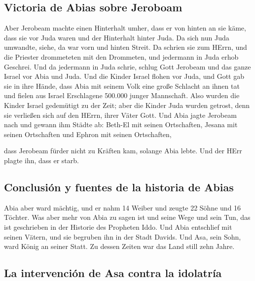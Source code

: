 \hypertarget{victoria-de-abias-sobre-jeroboam}{%
\subsection{Victoria de Abias sobre
Jeroboam}\label{victoria-de-abias-sobre-jeroboam}}

 Aber Jerobeam machte einen Hinterhalt umher, dass er von
hinten an sie käme, dass sie vor Juda waren und der Hinterhalt hinter
Juda.  Da sich nun Juda umwandte, siehe, da war vorn und
hinten Streit. Da schrien sie zum HErrn, und die Priester drommeteten
mit den Drommeten,  und jedermann in Juda erhob Geschrei.
Und da jedermann in Juda schrie, schlug Gott Jerobeam und das ganze
Israel vor Abia und Juda.  Und die Kinder Israel flohen
vor Juda, und Gott gab sie in ihre Hände,  dass Abia mit
seinem Volk eine große Schlacht an ihnen tat und fielen aus Israel
Erschlagene 500.000 junger Mannschaft.  Also wurden die
Kinder Israel gedemütigt zu der Zeit; aber die Kinder Juda wurden
getrost, denn sie verließen sich auf den HErrn, ihrer Väter Gott.
 Und Abia jagte Jerobeam nach und gewann ihm Städte ab:
Beth-El mit seinen Ortschaften, Jesana mit seinen Ortschaften und Ephron
mit seinen Ortschaften,

 dass Jerobeam fürder nicht zu Kräften kam, solange Abia
lebte. Und der HErr plagte ihn, dass er starb.

\hypertarget{conclusiuxf3n-y-fuentes-de-la-historia-de-abias}{%
\subsection{Conclusión y fuentes de la historia de
Abias}\label{conclusiuxf3n-y-fuentes-de-la-historia-de-abias}}

 Abia aber ward mächtig, und er nahm 14 Weiber und zeugte
22 Söhne und 16 Töchter.  Was aber mehr von Abia zu sagen
ist und seine Wege und sein Tun, das ist geschrieben in der Historie des
Propheten Iddo.  Und Abia entschlief mit seinen Vätern,
und sie begruben ihn in der Stadt Davids. Und Asa, sein Sohn, ward König
an seiner Statt. Zu dessen Zeiten war das Land still zehn Jahre.

\hypertarget{la-intervenciuxf3n-de-asa-contra-la-idolatruxeda}{%
\subsection{La intervención de Asa contra la
idolatría}\label{la-intervenciuxf3n-de-asa-contra-la-idolatruxeda}}

